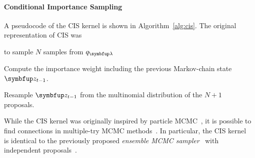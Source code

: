 \paragraph{Conditional Importance Sampling}
A pseudocode of the CIS kernel is shown in Algorithm~\ref{alg:cis}.
The original representation of CIS was
\begin{enumerate*}[label=(\arabic*)]
  \item to sample \(N\) samples from \(q_{\vlambda}\)
  \item Compute the importance weight including the previous Markov-chain state \(\vz_{t-1}\).
  \item Resample \(\vz_{t-1}\) from the multinomial distribution of the \(N+1\) proposals.
\end{enumerate*}

While the CIS kernel was originally inspired by particle MCMC~\citep{andrieu_particle_2010}, it is possible to find connections in multiple-try MCMC methods~\citep{martino_review_2018}.
In particular, the CIS kernel is identical to the previously proposed \textit{ensemble MCMC sampler}~\citep{neal_mcmc_2011a, austad_parallel_2007} with independent proposals~\citep[Table 12]{martino_review_2018}.

